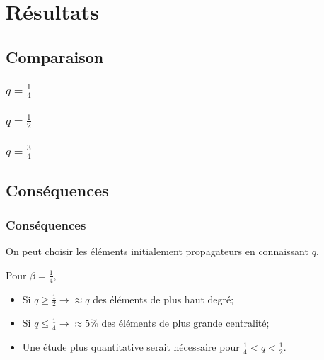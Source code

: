 \documentclass{beamer}
\newcommand{\resultat}[1]{
  \fontsize{8}{10}\selectfont
  \begin{center}
  
  \end{center}
}
\begin{document}
\section{Résultats}
\subsection{Comparaison}
\begin{frame}
  \frametitle{$q = \frac{1}{4}$}
  \resultat{all_finale_f_initiale_q25_pres}
\end{frame}

\begin{frame}
  \frametitle{$q = \frac{1}{2}$}
  \resultat{all_finale_f_initiale_q50_pres}
\end{frame}

\begin{frame}
  \frametitle{$q = \frac{3}{4}$}
  \resultat{all_finale_f_initiale_q75_pres}
\end{frame}

\subsection{Conséquences}
\begin{frame}
  \frametitle{Conséquences}

  \begin{alertblock}{}
  \begin{center}
    On peut choisir les éléments initialement propagateurs en connaissant $q$.
  \end{center}
  \end{alertblock}
  Pour $\beta=\frac{1}{4}$,
  \begin{itemize}
    \item Si $q \geq \frac{1}{2} \rightarrow \approx q$ des éléments de plus haut degré;
    \item Si $q \leq \frac{1}{4} \rightarrow \approx 5\%$ des éléments de plus grande centralité;
    \item Une étude plus quantitative serait nécessaire pour $\frac{1}{4} < q < \frac{1}{2}$.
  \end{itemize}
\end{frame}
\end{document}
